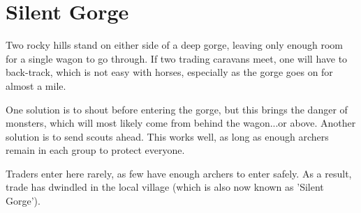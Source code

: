 \section{Silent Gorge}
\label{silentGorge}

\begin{multicols}{2}

Two rocky hills stand on either side of a deep gorge, leaving only enough room for a single wagon to go through.
If two trading caravans meet, one will have to back-track, which is not easy with horses, especially as the gorge goes on for almost a mile.

One solution is to shout before entering the gorge, but this brings the danger of monsters, which will most likely come from behind the wagon...or above.
Another solution is to send scouts ahead.
This works well, as long as enough archers remain in each group to protect everyone.

Traders enter here rarely, as few have enough archers to enter safely.
As a result, trade has dwindled in the local \gls{village} (which is also now known as 'Silent Gorge').

\end{multicols}
